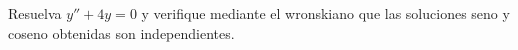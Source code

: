 Resuelva $y''+4y=0$ y verifique mediante el wronskiano que las soluciones seno y coseno obtenidas son independientes.
